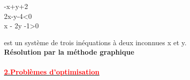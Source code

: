 \documentclass[12pt]{article}
\begin{document}
\begin{System}
  -x+y+2 \\
   2x-y-4<0 \\
   x - 2y -1>0
\end{System}
est un système de trois inéquations à deux inconnues x et y.\\
\textbf{Résolution par la méthode graphique}\\
\\
\underline{\textbf{\textcolor{red}{2.Problèmes d'optimisation}}}\\
\end{document}
